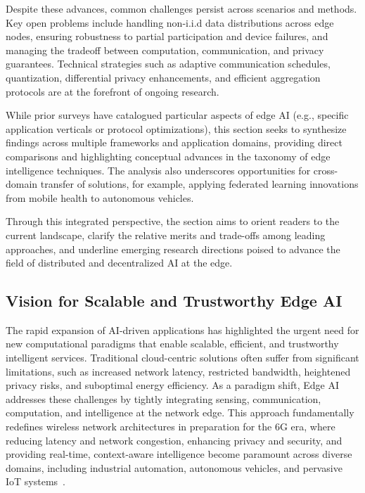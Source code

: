 \documentclass[sigconf]{acmart}
\begin{document}
Despite these advances, common challenges persist across scenarios and methods. Key open problems include handling non-i.i.d data distributions across edge nodes, ensuring robustness to partial participation and device failures, and managing the tradeoff between computation, communication, and privacy guarantees. Technical strategies such as adaptive communication schedules, quantization, differential privacy enhancements, and efficient aggregation protocols are at the forefront of ongoing research.

While prior surveys have catalogued particular aspects of edge AI (e.g., specific application verticals or protocol optimizations), this section seeks to synthesize findings across multiple frameworks and application domains, providing direct comparisons and highlighting conceptual advances in the taxonomy of edge intelligence techniques. The analysis also underscores opportunities for cross-domain transfer of solutions, for example, applying federated learning innovations from mobile health to autonomous vehicles. 

Through this integrated perspective, the section aims to orient readers to the current landscape, clarify the relative merits and trade-offs among leading approaches, and underline emerging research directions poised to advance the field of distributed and decentralized AI at the edge.

\subsection{Vision for Scalable and Trustworthy Edge AI}

The rapid expansion of AI-driven applications has highlighted the urgent need for new computational paradigms that enable scalable, efficient, and trustworthy intelligent services. Traditional cloud-centric solutions often suffer from significant limitations, such as increased network latency, restricted bandwidth, heightened privacy risks, and suboptimal energy efficiency. As a paradigm shift, Edge AI addresses these challenges by tightly integrating sensing, communication, computation, and intelligence at the network edge. This approach fundamentally redefines wireless network architectures in preparation for the 6G era, where reducing latency and network congestion, enhancing privacy and security, and providing real-time, context-aware intelligence become paramount across diverse domains, including industrial automation, autonomous vehicles, and pervasive IoT systems~\cite{ref49}.
\end{document}
